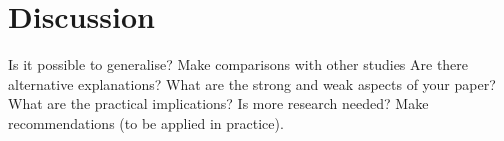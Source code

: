 \chapter{Discussion}
\label{chap:discuss}

Is it possible to generalise?
Make comparisons with other studies
Are there alternative explanations?
What are the strong and weak aspects of your paper?
What are the practical implications?
Is more research needed?
Make recommendations (to be applied in practice).
